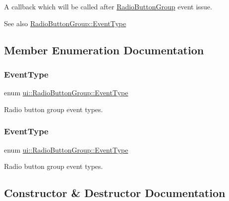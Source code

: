 A callback which will be called after \hyperlink{classui_1_1RadioButtonGroup}{Radio\+Button\+Group} event issue. \begin{DoxySeeAlso}{See also}
{\ttfamily \hyperlink{classui_1_1RadioButtonGroup_a41d61680b8001bd43abfccbf49eecef3}{Radio\+Button\+Group\+::\+Event\+Type}} 
\end{DoxySeeAlso}


\subsection{Member Enumeration Documentation}
\mbox{\label{classui_1_1RadioButtonGroup_a41d61680b8001bd43abfccbf49eecef3}} 
\subsubsection{\texorpdfstring{Event\+Type}{EventType}\hspace{0.1cm}{\footnotesize\ttfamily [1/2]}}
{\footnotesize\ttfamily enum \hyperlink{classui_1_1RadioButtonGroup_a41d61680b8001bd43abfccbf49eecef3}{ui\+::\+Radio\+Button\+Group\+::\+Event\+Type}\hspace{0.3cm}{\ttfamily [strong]}}

Radio button group event types. \mbox{\label{classui_1_1RadioButtonGroup_a41d61680b8001bd43abfccbf49eecef3}} 
\subsubsection{\texorpdfstring{Event\+Type}{EventType}\hspace{0.1cm}{\footnotesize\ttfamily [2/2]}}
{\footnotesize\ttfamily enum \hyperlink{classui_1_1RadioButtonGroup_a41d61680b8001bd43abfccbf49eecef3}{ui\+::\+Radio\+Button\+Group\+::\+Event\+Type}\hspace{0.3cm}{\ttfamily [strong]}}

Radio button group event types. 

\subsection{Constructor \& Destructor Documentation}
\mbox{\label{classui_1_1RadioButtonGroup_a68fedea375f325dcb934861768945c21}} 
